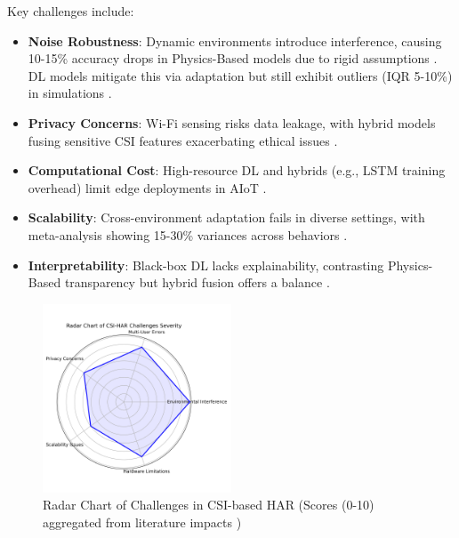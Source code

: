 \documentclass[Afour,sageh,times]{sagej}
\begin{document}
Key challenges include:
\begin{itemize}


\item \textbf{Noise Robustness}: Dynamic environments introduce interference, causing 10-15\% accuracy drops in Physics-Based models due to rigid assumptions \citep{yan2020wiact}. DL models mitigate this via adaptation but still exhibit outliers (IQR 5-10\%) in simulations \citep{chen2018wifi}.
\item \textbf{Privacy Concerns}: Wi-Fi sensing risks data leakage, with hybrid models fusing sensitive CSI features exacerbating ethical issues \citep{schulz2018shadow}.
\item \textbf{Computational Cost}: High-resource DL and hybrids (e.g., LSTM training overhead) limit edge deployments in AIoT \citep{shen2022graph}.
\item \textbf{Scalability}: Cross-environment adaptation fails in diverse settings, with meta-analysis showing 15-30\% variances across behaviors \citep{wang2021multimodal}.
\item \textbf{Interpretability}: Black-box DL lacks explainability, contrasting Physics-Based transparency but hybrid fusion offers a balance \citep{wang2022caution}.
\end{itemize}
\begin{figure}[htbp]
\centering
\includegraphics[width=0.5\textwidth]{12.section9_figure.png}
\caption{Radar Chart of Challenges in CSI-based HAR (Scores (0-10) aggregated from literature impacts  \citep{guo2019robust, chen2018wifi, zafari2019survey})}
\label{fig:har_challenges_radar}
\end{figure}
\end{document}
